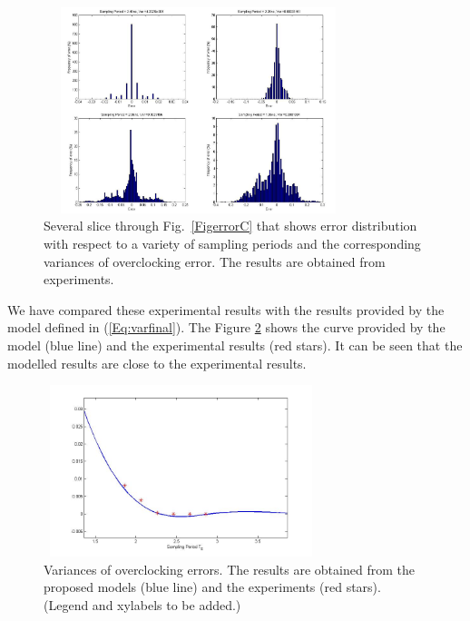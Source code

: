 \documentclass[journal]{IEEEtran}
\begin{document}
\begin{figure}[tbp]
\centering
	\includegraphics[width=9cm,height=6cm]{./Figures/gaussianOnlinedistr}
	\caption{Several slice through Fig.~\ref{FigerrorC} that shows error distribution with respect to a variety of sampling periods and the corresponding variances of overclocking error. The results are obtained from experiments.}
	\label{Fig:gaussianOnlinedistr}
\end{figure}




We have compared these experimental results with the results provided by the model defined in (\ref{Eq:varfinal}). The Figure \ref{Error_Function_Spline_experiment} shows the curve provided by the model (blue line) and the experimental results (red stars). It can be seen that the modelled results are close to the experimental results. 




\begin{figure}[tbp]
\begin{center}
\includegraphics[width=8cm,height=5cm]{./Figures/Error_Function_Spline_experiment}
\caption{Variances of overclocking errors. The results are obtained from the proposed models (blue line) and the experiments (red stars). (Legend and xylabels to be added.) }\label{Error_Function_Spline_experiment}
\end{center}
\end{figure}
\end{document}
